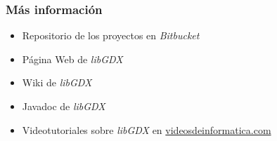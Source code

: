 \documentclass[xcolor={dvipsnames}]{beamer}
\begin{document}
\begin{frame}\frametitle{Más información}
    \begin{itemize}
        \item Repositorio de los proyectos en \emph{Bitbucket} \href{https://bitbucket.org/sfaci/java-libgdx}{}
        \item Página Web de \emph{\textcolor{resalta}{libGDX}} \href{https://libgdx.badlogicgames.com}{}
        \item Wiki de \emph{\textcolor{resalta}{libGDX}} \href{https://github.com/libgdx/libgdx/wiki}{}
        \item Javadoc de \emph{\textcolor{resalta}{libGDX}} \href{https://libgdx.badlogicgames.com/nightlies/docs/api}{}
        \item Videotutoriales sobre \emph{\textcolor{resalta}{libGDX}} en \href{http://videosdeinformatica.com}{videosdeinformatica.com}
        \href{https://videosdeinformatica.com/tag/libgdx}{}
    \end{itemize}
\end{frame}
\end{document}
